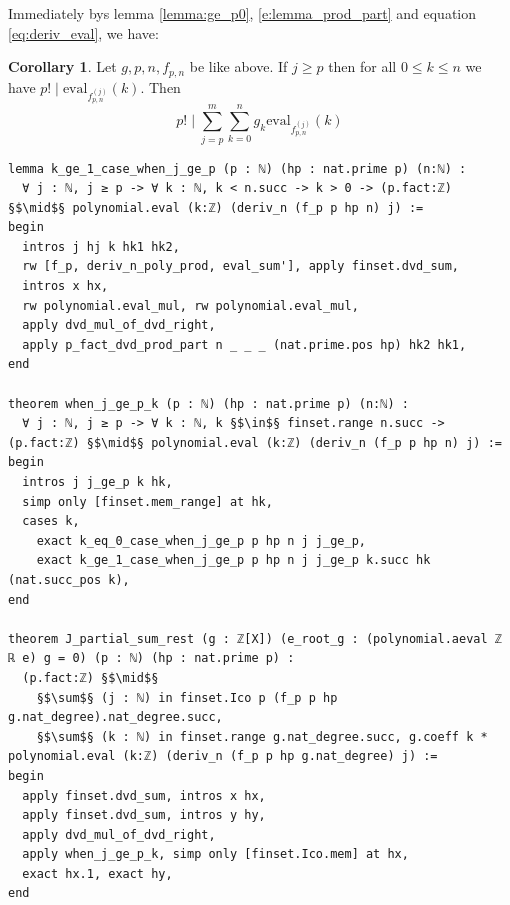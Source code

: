 \documentclass{report}
\theoremstyle{definition}
\newtheorem{corollary}{Corollary}[section]
\begin{document}
Immediately bys lemma \ref{lemma:ge_p0}, \ref{e:lemma_prod_part} and equation \ref{eq:deriv_eval}, we have:
\begin{corollary}
Let $g,p,n,f_{p,n}$ be like above. If $j\ge p$ then for all $0\le k\le n$ we have $p!\mid\mathrm{eval}_{f_{p,n}^{(j)}}(k)$. Then
$$
p!\mid\sum_{j=p}^m\sum_{k=0}^n g_k\mathrm{eval}_{f_{p,n}^{(j)}}(k)
$$

\begin{verbatim}
lemma k_ge_1_case_when_j_ge_p (p : ℕ) (hp : nat.prime p) (n:ℕ) :
  ∀ j : ℕ, j ≥ p -> ∀ k : ℕ, k < n.succ -> k > 0 -> (p.fact:ℤ) §$\mid$§ polynomial.eval (k:ℤ) (deriv_n (f_p p hp n) j) := 
begin
  intros j hj k hk1 hk2,
  rw [f_p, deriv_n_poly_prod, eval_sum'], apply finset.dvd_sum, 
  intros x hx,
  rw polynomial.eval_mul, rw polynomial.eval_mul,
  apply dvd_mul_of_dvd_right,
  apply p_fact_dvd_prod_part n _ _ _ (nat.prime.pos hp) hk2 hk1,
end

theorem when_j_ge_p_k (p : ℕ) (hp : nat.prime p) (n:ℕ) :
  ∀ j : ℕ, j ≥ p -> ∀ k : ℕ, k §$\in$§ finset.range n.succ -> (p.fact:ℤ) §$\mid$§ polynomial.eval (k:ℤ) (deriv_n (f_p p hp n) j) :=
begin
  intros j j_ge_p k hk,
  simp only [finset.mem_range] at hk,
  cases k,
    exact k_eq_0_case_when_j_ge_p p hp n j j_ge_p,
    exact k_ge_1_case_when_j_ge_p p hp n j j_ge_p k.succ hk (nat.succ_pos k),
end

theorem J_partial_sum_rest (g : ℤ[X]) (e_root_g : (polynomial.aeval ℤ ℝ e) g = 0) (p : ℕ) (hp : nat.prime p) :
  (p.fact:ℤ) §$\mid$§ 
    §$\sum$§ (j : ℕ) in finset.Ico p (f_p p hp g.nat_degree).nat_degree.succ,
    §$\sum$§ (k : ℕ) in finset.range g.nat_degree.succ, g.coeff k * polynomial.eval (k:ℤ) (deriv_n (f_p p hp g.nat_degree) j) :=
begin
  apply finset.dvd_sum, intros x hx, 
  apply finset.dvd_sum, intros y hy,
  apply dvd_mul_of_dvd_right,
  apply when_j_ge_p_k, simp only [finset.Ico.mem] at hx, 
  exact hx.1, exact hy,
end
\end{verbatim}
\end{corollary}
\end{document}
